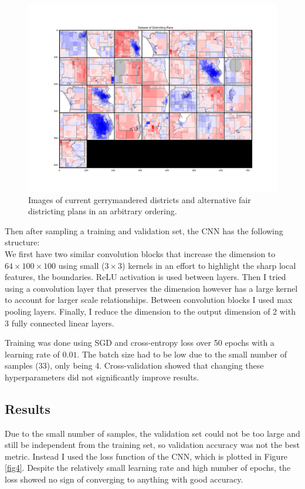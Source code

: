 \documentclass[a4paper]{article}
\theoremstyle{definition}
\begin{document}
	
	\begin{figure}[h]
		\centering
		\includegraphics[scale=.3]{plans.png}
		\caption{Images of current gerrymandered districts and alternative fair districting plans in an arbitrary ordering.}\label{fig3}
	\end{figure}

	Then after sampling a training and validation set, the CNN has the following structure:\\
	We first have two similar convolution blocks that increase the dimension to $ 64\times 100\times 100 $ using small ($ 3\times 3 $) kernels in an effort to highlight the sharp local features, the boundaries. ReLU activation is used between layers. Then I tried using a convolution layer that preserves the dimension however has a large kernel to account for larger scale relationships. Between convolution blocks I used max pooling layers. Finally, I reduce the dimension to the output dimension of 2 with 3 fully connected linear layers.
	
	Training was done using SGD and cross-entropy loss over 50 epochs with a learning rate of $ 0.01 $. The batch size had to be low due to the small number of samples (33), only being 4. Cross-validation showed that changing these hyperparameters did not significantly improve results.
	
	\subsection{Results}
	Due to the small number of samples, the validation set could not be too large and still be independent from the training set, so validation accuracy was not the best metric. Instead I used the loss function of the CNN, which is plotted in Figure \ref{fig4}. Despite the relatively small learning rate and high number of epochs, the loss showed no sign of converging to anything with good accuracy.
\end{document}
